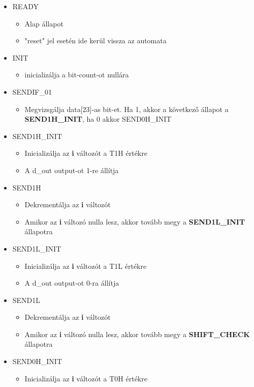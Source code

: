 \documentclass[10pt]{article} %
\begin{document}
\begin{itemize}
\item READY
	\begin{itemize}
	\item Alap állapot 
	\item "reset" jel esetén ide kerül vissza az automata
	\end{itemize}
\item INIT
	\begin{itemize}
	\item inicializálja a bit-count-ot nullára
	\end{itemize}
\item SENDIF\_01
	\begin{itemize}
	\item Megvizsgálja data[23]-as bit-et. Ha 1, akkor a következő állapot a \textbf{SEND1H\_INIT}, ha 0 akkor SEND0H\_INIT
	\end{itemize}
\item SEND1H\_INIT
	\begin{itemize}
	\item Inicializálja az \textbf{i} változót a T1H értékre
	\item A d\_out output-ot 1-re állítja
	\end{itemize}
\item SEND1H
	\begin{itemize}
	\item Dekrementálja az \textbf{i} változót
	\item Amikor az \textbf{i} változó nulla lesz, akkor tovább megy a \textbf{SEND1L\_INIT} állapotra
	\end{itemize}
\item SEND1L\_INIT
	\begin{itemize}
	\item Inicializálja az \textbf{i} változót a T1L értékre
	\item A d\_out output-ot 0-ra állítja
	\end{itemize}
\item SEND1L
	\begin{itemize}
	\item Dekrementálja az \textbf{i} változót
	\item Amikor az \textbf{i} változó nulla lesz, akkor tovább megy a \textbf{SHIFT\_CHECK} állapotra
	\end{itemize}
\item SEND0H\_INIT
	\begin{itemize}
	\item Inicializálja az \textbf{i} változót a T0H értékre

\end{itemize}
\end{itemize}
\end{document}
